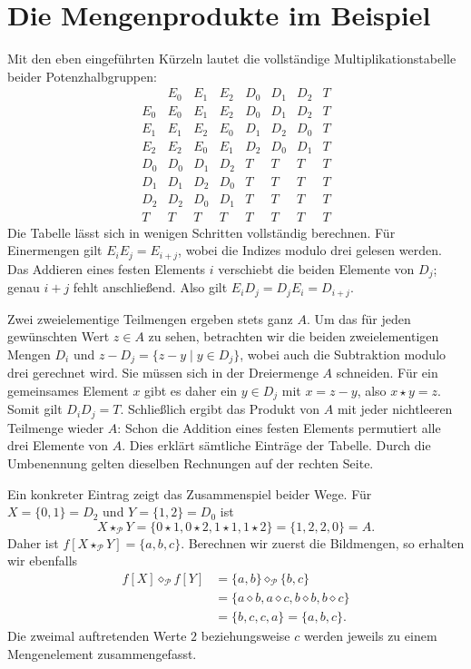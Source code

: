 \clearpage
\section*{Die Mengenprodukte im Beispiel}

Mit den eben eingeführten Kürzeln lautet die vollständige
Multiplikationstabelle beider Potenzhalbgruppen:
\[
  \begin{array}{c|ccccccc}
    &E_0&E_1&E_2&D_0&D_1&D_2&T\\\hline
    E_0&E_0&E_1&E_2&D_0&D_1&D_2&T\\
    E_1&E_1&E_2&E_0&D_1&D_2&D_0&T\\
    E_2&E_2&E_0&E_1&D_2&D_0&D_1&T\\
    D_0&D_0&D_1&D_2&T&T&T&T\\
    D_1&D_1&D_2&D_0&T&T&T&T\\
    D_2&D_2&D_0&D_1&T&T&T&T\\
    T&T&T&T&T&T&T&T
  \end{array}
\]
Die Tabelle lässt sich in wenigen Schritten vollständig berechnen.
Für Einermengen gilt \(E_iE_j=E_{i+j}\), wobei die Indizes modulo drei
gelesen werden. Das Addieren eines festen Elements \(i\) verschiebt
die beiden Elemente von \(D_j\); genau \(i+j\) fehlt anschließend.
Also gilt \(E_iD_j=D_jE_i=D_{i+j}\).

Zwei zweielementige Teilmengen ergeben stets ganz \(A\). Um das für
jeden gewünschten Wert \(z\in A\) zu sehen, betrachten wir die beiden
zweielementigen Mengen \(D_i\) und
\(z-D_j=\{z-y\mid y\in D_j\}\), wobei auch die Subtraktion
modulo drei gerechnet wird. Sie müssen sich in der
Dreiermenge \(A\) schneiden. Für ein gemeinsames Element \(x\)
gibt es daher ein \(y\in D_j\) mit \(x=z-y\), also \(x\star y=z\).
Somit gilt \(D_iD_j=T\). Schließlich ergibt das Produkt von \(A\)
mit jeder nichtleeren Teilmenge wieder \(A\): Schon die Addition
eines festen Elements permutiert alle drei Elemente von \(A\).
Dies erklärt sämtliche Einträge der Tabelle. Durch die Umbenennung
gelten dieselben Rechnungen auf der rechten Seite.

Ein konkreter Eintrag zeigt das Zusammenspiel beider Wege. Für
\(X=\{0,1\}=D_2\) und \(Y=\{1,2\}=D_0\) ist
\[
  X\star_{\mathcal P}Y
    =\{0\star1,0\star2,1\star1,1\star2\}
    =\{1,2,2,0\}=A.
\]
Daher ist \(f[X\star_{\mathcal P}Y]=\{a,b,c\}\).
Berechnen wir zuerst die Bildmengen, so erhalten wir ebenfalls
\[
  \begin{aligned}
    f[X]\diamond_{\mathcal P}f[Y]
      &=\{a,b\}\diamond_{\mathcal P}\{b,c\}\\
      &=\{a\diamond b,a\diamond c,b\diamond b,b\diamond c\}\\
      &=\{b,c,c,a\}=\{a,b,c\}.
  \end{aligned}
\]
Die zweimal auftretenden Werte \(2\) beziehungsweise \(c\) werden
jeweils zu einem Mengenelement zusammengefasst.

